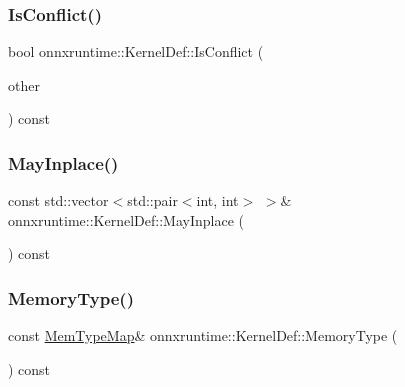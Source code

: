 \subsubsection{\texorpdfstring{Is\+Conflict()}{IsConflict()}}
{\footnotesize\ttfamily bool onnxruntime\+::\+Kernel\+Def\+::\+Is\+Conflict (\begin{DoxyParamCaption}\item[{const \mbox{\hyperlink{classonnxruntime_1_1KernelDef}{Kernel\+Def}} \&}]{other }\end{DoxyParamCaption}) const}

\mbox{\label{classonnxruntime_1_1KernelDef_ada61b5a989565708579fff57468f48fd}} 
\subsubsection{\texorpdfstring{May\+Inplace()}{MayInplace()}}
{\footnotesize\ttfamily const std\+::vector$<$std\+::pair$<$int, int$>$ $>$\& onnxruntime\+::\+Kernel\+Def\+::\+May\+Inplace (\begin{DoxyParamCaption}{ }\end{DoxyParamCaption}) const\hspace{0.3cm}{\ttfamily [inline]}}

\mbox{\label{classonnxruntime_1_1KernelDef_ab2d22ffd3fb8b3eec5c52ff20adc45d3}} 
\subsubsection{\texorpdfstring{Memory\+Type()}{MemoryType()}}
{\footnotesize\ttfamily const \mbox{\hyperlink{namespaceonnxruntime_ad53d5ace215052258a4346ee68c2624e}{Mem\+Type\+Map}}\& onnxruntime\+::\+Kernel\+Def\+::\+Memory\+Type (\begin{DoxyParamCaption}{ }\end{DoxyParamCaption}) const\hspace{0.3cm}{\ttfamily [inline]}}

\mbox{\label{classonnxruntime_1_1KernelDef_ae874d0d7c281f29444425cf090bd9f79}} 
